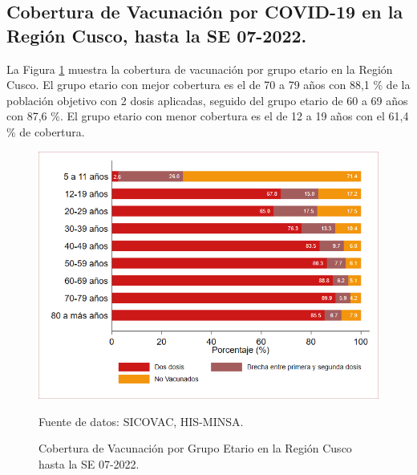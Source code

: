 \documentclass[12pt,a4paper,openany]{book}
\begin{document}
	\subsection*{Cobertura de Vacunación por COVID-19 en la Región Cusco, hasta la SE 07-2022.}
\noindent La Figura \ref{fig:vacuna_edad} muestra la cobertura de vacunación por grupo etario en la Región Cusco. El grupo etario con mejor cobertura es el de 70 a 79 años con 88,1 $\%$ de la población objetivo con 2 dosis aplicadas, seguido del grupo etario de 60 a 69 años con 87,6 $\%$. El grupo etario con menor cobertura es el de 12 a 19 años con el 61,4 $\%$ de cobertura.  

\begin{figure}[h]
	\caption{Cobertura de Vacunación por Grupo Etario en la Región Cusco hasta la SE 07-2022. }\label{fig:vacuna_edad}
	\begin{center}
		\includegraphics[width=0.90\linewidth]{../figuras/vacunacion_grupo_edad.png}
	\end{center}
	{\footnotesize {Fuente de datos: SICOVAC, HIS-MINSA.}}
\end{figure}
\end{document}
